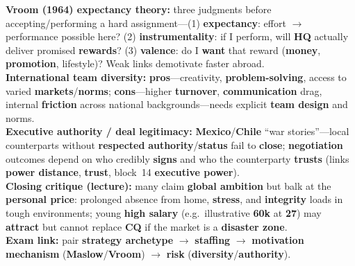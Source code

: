 \documentclass[10pt,a4paper]{article}
\begin{document}
{\textbf{Vroom (1964) expectancy theory:} three judgments before accepting/performing a hard assignment---(1) \textbf{expectancy}: effort $\rightarrow$ performance possible here? (2) \textbf{instrumentality}: if I perform, will \textbf{HQ} actually deliver promised \textbf{rewards}? (3) \textbf{valence}: do I \textbf{want} that reward (\textbf{money}, \textbf{promotion}, lifestyle)? Weak links demotivate faster abroad.\\
\textbf{International team diversity:} \textbf{pros}---creativity, \textbf{problem-solving}, access to varied \textbf{markets}/\textbf{norms}; \textbf{cons}---higher \textbf{turnover}, \textbf{communication} drag, internal \textbf{friction} across national backgrounds---needs explicit \textbf{team design} and norms.\\
\textbf{Executive authority / deal legitimacy:} \textbf{Mexico}/\textbf{Chile} ``war stories''---local counterparts without \textbf{respected} \textbf{authority}/\textbf{status} fail to \textbf{close}; \textbf{negotiation} outcomes depend on who credibly \textbf{signs} and who the counterparty \textbf{trusts} (links \textbf{power distance}, \textbf{trust}, block~14 \textbf{executive power}).\\
\textbf{Closing critique (lecture):} many claim \textbf{global ambition} but balk at the \textbf{personal price}: prolonged absence from home, \textbf{stress}, and \textbf{integrity} loads in tough environments; young \textbf{high salary} (e.g.\ illustrative \textbf{60k} at \textbf{27}) may \textbf{attract} but cannot replace \textbf{CQ} if the market is a \textbf{disaster zone}.\\
\textbf{Exam link:} pair \textbf{strategy archetype} $\rightarrow$ \textbf{staffing} $\rightarrow$ \textbf{motivation mechanism} (\textbf{Maslow}/\textbf{Vroom}) $\rightarrow$ \textbf{risk} (\textbf{diversity}/\textbf{authority}).
}
\end{document}
